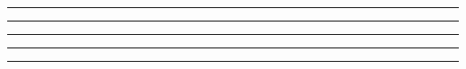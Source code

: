\noindent\rule{7in}{1.5pt}


\begin{problem}{4.10}

\end{problem}
\begin{solution}

\end{solution}

\noindent\rule{7in}{1.5pt}


\begin{problem}{4.11}

\end{problem}
\begin{solution}

\end{solution}

\noindent\rule{7in}{1.5pt}


\begin{problem}{4.12}

\end{problem}
\begin{solution}

\end{solution}

\noindent\rule{7in}{1.5pt}


\begin{problem}{4.13}

\end{problem}
\begin{solution}

\end{solution}

\noindent\rule{7in}{1.5pt}


